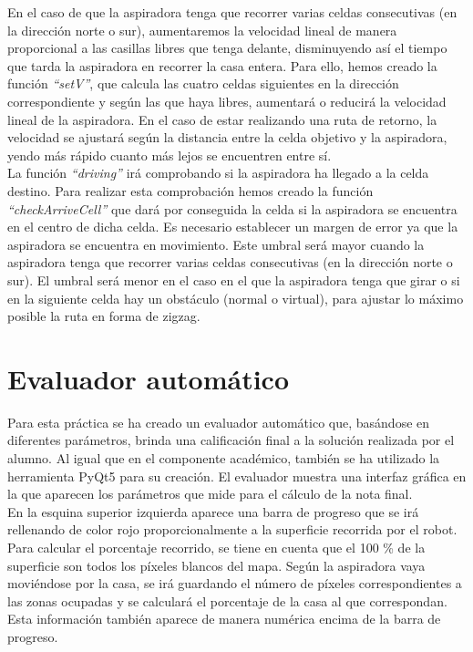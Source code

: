 En el caso de que la aspiradora tenga que recorrer varias celdas consecutivas (en la dirección norte o sur), aumentaremos la velocidad lineal de manera proporcional a las casillas libres que tenga delante, disminuyendo así el tiempo que tarda la aspiradora en recorrer la casa entera. Para ello, hemos creado la función \textit{``setV''}, que calcula las cuatro celdas siguientes en la dirección correspondiente y según las que haya libres, aumentará o reducirá la velocidad lineal de la aspiradora. En el caso de estar realizando una ruta de retorno, la velocidad se ajustará según la distancia entre la celda objetivo y la aspiradora, yendo más rápido cuanto más lejos se encuentren entre sí.\\

La función \textit{``driving''} irá comprobando si la aspiradora ha llegado a la celda destino. Para realizar esta comprobación hemos creado la función \textit{``checkArriveCell''} que dará por conseguida la celda si la aspiradora se encuentra en el centro de dicha celda. Es necesario establecer un margen de error ya que la aspiradora se encuentra en movimiento. Este umbral será mayor cuando la aspiradora tenga que recorrer varias celdas consecutivas (en la dirección norte o sur). El umbral será menor en el caso en el que la aspiradora tenga que girar o si en la siguiente celda hay un obstáculo (normal o virtual), para ajustar lo máximo posible la ruta en forma de zigzag. 



\section{Evaluador automático} 
Para esta práctica se ha creado un evaluador automático que, basándose en diferentes parámetros, brinda una calificación final a la solución realizada por el alumno. Al igual que en el componente académico, también se ha utilizado la herramienta PyQt5 para su creación. El evaluador muestra una interfaz gráfica en la que aparecen los parámetros que mide para el cálculo de la nota final.\\

En la esquina superior izquierda aparece una barra de progreso que se irá rellenando de color rojo proporcionalmente a la superficie recorrida por el robot. Para calcular el porcentaje recorrido, se tiene en cuenta que el 100 \% de la superficie son todos los píxeles blancos del mapa. Según la aspiradora vaya moviéndose por la casa, se irá guardando el número de píxeles correspondientes a las zonas ocupadas y se calculará el porcentaje de la casa al que correspondan. Esta información también aparece de manera numérica encima de la barra de progreso.\\

